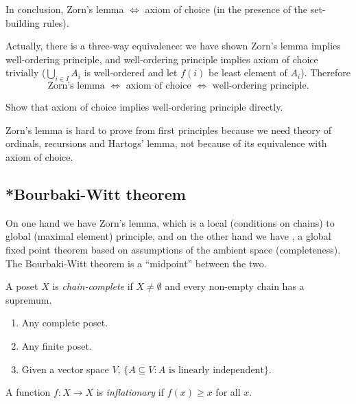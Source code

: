 \documentclass[a4paper]{article}
\begin{document}
In conclusion, Zorn's lemma \(\iff\) axiom of choice (in the presence of the set-building rules).

Actually, there is a three-way equivalence: we have shown Zorn's lemma implies well-ordering principle, and well-ordering principle implies axiom of choice trivially (\(\bigcup_{i \in I} A_i\) is well-ordered and let \(f(i)\) be least element of \(A_i\)). Therefore
\[
  \text{Zorn's lemma } \iff \text{ axiom of choice } \iff \text{ well-ordering principle}.
\]

\begin{ex}
  Show that axiom of choice implies well-ordering principle directly.
\end{ex}

\begin{note}
  Zorn's lemma is hard to prove from first principles because we need theory of ordinals, recursions and Hartogs' lemma, not because of its equivalence with axiom of choice.
\end{note}

\subsection{*Bourbaki-Witt theorem}

On one hand we have Zorn's lemma, which is a local (conditions on chains) to global (maximal element) principle, and on the other hand we have , a global fixed point theorem based on assumptions of the ambient space (completeness). The Bourbaki-Witt theorem is a ``midpoint'' between the two.

\begin{definition}
  A poset \(X\) is \emph{chain-complete} if \(X \neq \emptyset\) and every non-empty chain has a supremum.
\end{definition}

\begin{eg}\leavevmode
  \begin{enumerate}
  \item Any complete poset.
  \item Any finite poset.
  \item Given a vector space \(V\), \(\{A \subseteq V: A \text{ is linearly independent}\}\).
  \end{enumerate}
\end{eg}

\begin{definition}[Inflationary]
  A function \(f: X \to X\) is \emph{inflationary} if \(f(x) \geq x\) for all \(x\).
\end{definition}
\end{document}
